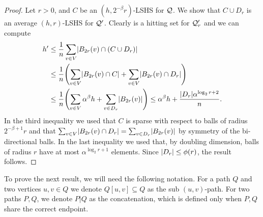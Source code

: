 \begin{proof}
Let $r>0$, and $C$ be an $(h,2^{-\beta}r)$-LSHS for $\mathcal{Q}$.
We show that $C\cup D_r$ is an average $(h,r)$-LSHS for $\mathcal{Q}'$.
Clearly is a hitting set for $\mathcal{Q}'_r$ and we can compute
\begin{align*}
h'&\leq \frac{1}{n}\sum_{v\in V} \abs{B_{2r}(v)\cap (C\cup D_r)}\\
&\leq \frac{1}{n}\prn*{\sum_{v\in V} \abs{B_{2r}(v)\cap C}+\sum_{v\in V} \abs{B_{2r}(v)\cap D_r}}\\
&\leq \frac{1}{n}\prn*{\sum_{v\in V} \alpha^\beta h+\sum_{v\in D_r} \abs{B_{2r}(v)}}
\leq \alpha^\beta h + \frac{\abs{D_r}\alpha^{\log_2r+2}}{n}.
\end{align*}
In the third inequality we used that $C$ is sparse with respect to balls of radius $2^{-\beta+1}r$ and that $\sum_{v\in V} \lvert B_{2r}(v)\cap D_r\rvert=\sum_{v\in D_r} \lvert B_{2r}(v)\rvert$ by symmetry of the bi-directional balls.
In the last inequality we used that, by doubling dimension, balls of radius $r$ have at most $\alpha^{\log_2r+1}$ elements.
Since $\lvert D_r\rvert\leq \phi(r)$, the result follows.
\end{proof}

To prove the next result, we will need the following notation.
For a path $Q$ and two vertices $u,v\in Q$ we denote $Q[u,v]\subseteq Q$ as the sub $(u,v)$-path.
For two paths $P,Q$, we denote $P|Q$ as the concatenation, which is defined only when $P,Q$ share the correct endpoint.

